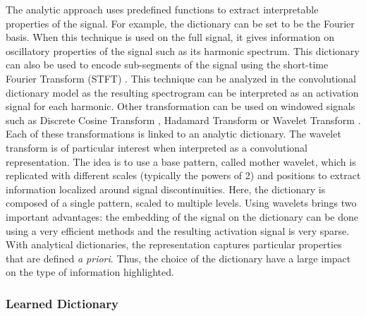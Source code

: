 \documentclass[../thesis.tex]{subfiles}
\begin{document}
	The analytic approach uses predefined functions to extract
	interpretable properties of the signal. For example, the dictionary can
	be set to be the Fourier basis. When this technique is used on the full signal,
	it gives information on oscillatory properties of the signal such as its
	harmonic spectrum. This dictionary can also be used to encode sub-segments
	of the signal using the short-time Fourier Transform (STFT) \citep{Gabor1946}.
	This technique can be analyzed in the convolutional dictionary model as the
	resulting spectrogram can be interpreted as an activation signal for each
	harmonic. Other transformation can be used on windowed signals such as Discrete
	Cosine Transform \citep{Ahmed1974}, Hadamard Transform \citep{pratt1969hadamard}
	or Wavelet Transform \citep{Mallat2008}. Each of these transformations is
	linked to an analytic dictionary. The wavelet transform is of particular
	interest when interpreted as a convolutional representation. The
	idea is to use a base pattern, called mother wavelet, which is replicated
	with different scales (typically the powers of 2) and positions to extract
	information localized around signal discontinuities. Here, the dictionary
	is composed of a single pattern, scaled to multiple levels. Using wavelets
	brings two important advantages: the embedding of the signal on the
	dictionary can be done using a very efficient methods and the resulting
	activation signal is very sparse. With analytical dictionaries, the
	representation captures particular properties that are defined \emph{a priori}.
	Thus, the choice of the dictionary have a large impact on the type of
	information highlighted.


\subsubsection{Learned Dictionary}
\label{ssub:learned_dict}
\end{document}

